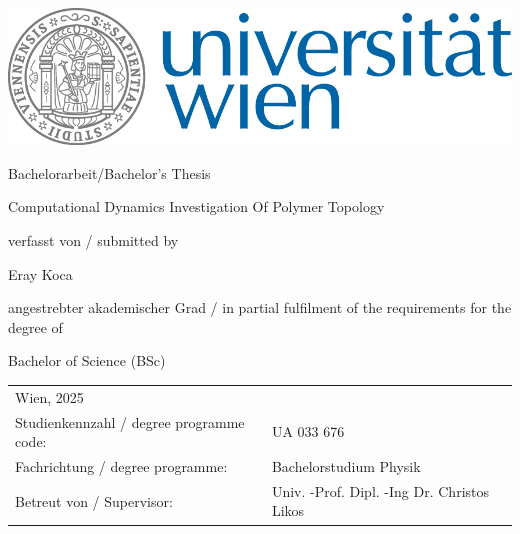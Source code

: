 \documentclass{article}      %
\begin{document}

 
\thispagestyle{empty}
\begin{center}
\begin{minipage}{0.9\linewidth}
\flushright
	      		 
    \includegraphics[width=0.5\linewidth]{univie.jpg}\par
    \vspace{1.5cm}
\centering 	
	{\scshape{\LARGE Bachelorarbeit/Bachelor's Thesis\par}}
	\vspace{1cm}
    {\scshape{\Large Computational Dynamics Investigation Of Polymer Topology \par}}
    \vspace{2cm}
    
  
 verfasst von / submitted by  \linebreak
 {\Large Eray Koca\par}
 	\vspace{1.5cm}
angestrebter akademischer Grad / in partial fulfilment of the requirements for the degree of\linebreak
 {\Large Bachelor of Science (BSc)\par}
	\vspace{1.5cm}

\flushleft
	

\begin{tabular}{ll}
Wien, 2025	\linebreak
\vspace{1cm}&   \\
  Studienkennzahl / degree programme code: & UA 033 676 \vspace{0.3cm} \\ 
  Fachrichtung / degree programme: & Bachelorstudium Physik \vspace{0.3cm} \\
  Betreut von / Supervisor: &  Univ. -Prof. Dipl. -Ing Dr. Christos Likos\\
 \end{tabular}


    
    
\end{minipage}
\end{center}
\clearpage
\end{document}

